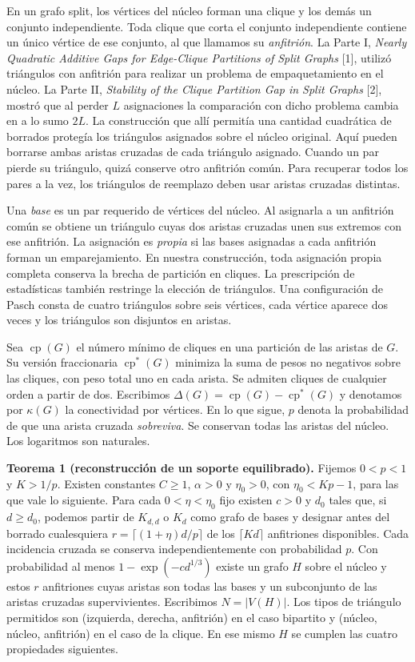 \documentclass[spanish,11pt,a4paper]{article}
\begin{document}
En un grafo split, los vértices del núcleo forman una clique y los demás un conjunto independiente. Toda clique que corta el conjunto independiente contiene un único vértice de ese conjunto, al que llamamos su \emph{anfitrión}. La Parte I, \emph{Nearly Quadratic Additive Gaps for Edge-Clique Partitions of Split Graphs} {[}1{]}, utilizó triángulos con anfitrión para realizar un problema de empaquetamiento en el núcleo. La Parte II, \emph{Stability of the Clique Partition Gap in Split Graphs} {[}2{]}, mostró que al perder \(L\) asignaciones la comparación con dicho problema cambia en a lo sumo \(2L\). La construcción que allí permitía una cantidad cuadrática de borrados protegía los triángulos asignados sobre el núcleo original. Aquí pueden borrarse ambas aristas cruzadas de cada triángulo asignado. Cuando un par pierde su triángulo, quizá conserve otro anfitrión común. Para recuperar todos los pares a la vez, los triángulos de reemplazo deben usar aristas cruzadas distintas.

Una \emph{base} es un par requerido de vértices del núcleo. Al asignarla a un anfitrión común se obtiene un triángulo cuyas dos aristas cruzadas unen sus extremos con ese anfitrión. La asignación es \emph{propia} si las bases asignadas a cada anfitrión forman un emparejamiento. En nuestra construcción, toda asignación propia completa conserva la brecha de partición en cliques. La prescripción de estadísticas también restringe la elección de triángulos. Una configuración de Pasch consta de cuatro triángulos sobre seis vértices, cada vértice aparece dos veces y los triángulos son disjuntos en aristas.

Sea \(\operatorname{cp}(G)\) el número mínimo de cliques en una partición de las aristas de \(G\). Su versión fraccionaria \(\operatorname{cp}^{\ast}(G)\) minimiza la suma de pesos no negativos sobre las cliques, con peso total uno en cada arista. Se admiten cliques de cualquier orden a partir de dos. Escribimos \(\Delta(G)=\operatorname{cp}(G)-\operatorname{cp}^{\ast}(G)\) y denotamos por \(\kappa(G)\) la conectividad por vértices. En lo que sigue, \(p\) denota la probabilidad de que una arista cruzada \emph{sobreviva}. Se conservan todas las aristas del núcleo. Los logaritmos son naturales.

\textbf{Teorema 1 (reconstrucción de un soporte equilibrado).} Fijemos \(0<p<1\) y \(K>1/p\). Existen constantes \(C\ge1\), \(\alpha>0\) y \(\eta_0>0\), con \(\eta_0<Kp-1\), para las que vale lo siguiente. Para cada \(0<\eta<\eta_0\) fijo existen \(c>0\) y \(d_0\) tales que, si \(d\ge d_0\), podemos partir de \(K_{d,d}\) o \(K_d\) como grafo de bases y designar antes del borrado cualesquiera \(r=\lceil(1+\eta)d/p\rceil\) de los \(\lceil Kd\rceil\) anfitriones disponibles. Cada incidencia cruzada se conserva independientemente con probabilidad \(p\). Con probabilidad al menos \(1-\exp(-c d^{1/3})\) existe un grafo \(H\) sobre el núcleo y estos \(r\) anfitriones cuyas aristas son todas las bases y un subconjunto de las aristas cruzadas supervivientes. Escribimos \(N=|V(H)|\). Los tipos de triángulo permitidos son (izquierda, derecha, anfitrión) en el caso bipartito y (núcleo, núcleo, anfitrión) en el caso de la clique. En ese mismo \(H\) se cumplen las cuatro propiedades siguientes.
\end{document}
